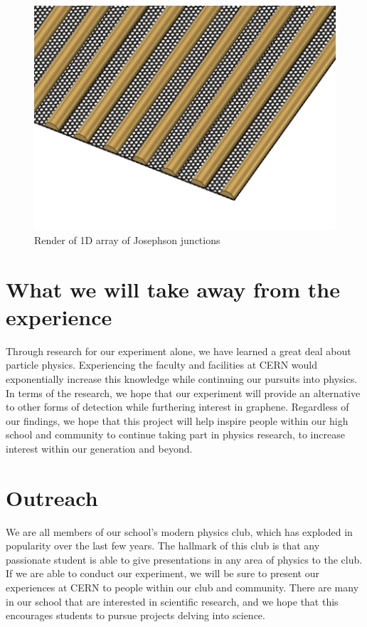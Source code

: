 \documentclass{article}
\begin{document}
\begin{figure}[H]
\includegraphics[scale=0.3]{junctions.png}
\caption{Render of 1D array of Josephson junctions}
\end{figure}

    \section{What we will take away from the experience}

    \indent Through research for our experiment alone, we have learned a great deal about particle physics. Experiencing the faculty and facilities at CERN would exponentially increase this knowledge while continuing our pursuits into physics. In terms of the research, we hope that our experiment will provide an alternative to other forms of detection while furthering interest in graphene. Regardless of our findings, we hope that this project will help inspire people within our high school and community to continue taking part in physics research, to increase interest within our generation and beyond.

    \section{Outreach}

    \indent We are all members of our school's modern physics club, which has exploded in popularity over the last few years. The hallmark of this club is that any passionate student is able to give presentations in any area of physics to the club. If we are able to conduct our experiment, we will be sure to present our experiences at CERN to people within our club and community. There are many in our school that are interested in scientific research, and we hope that this encourages students to pursue projects delving into science.

    
    
\end{document}
